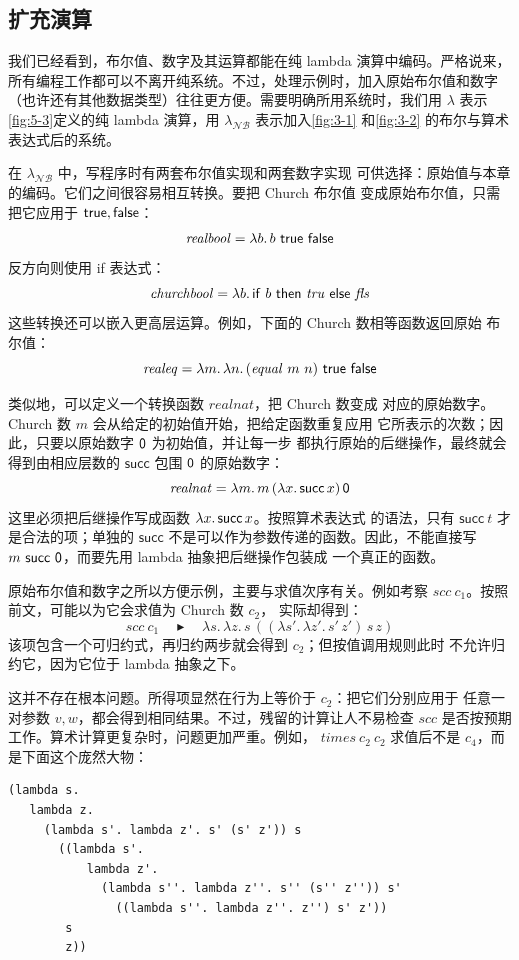 \subsection*{扩充演算}

我们已经看到，布尔值、数字及其运算都能在纯 lambda 演算中编码。严格说来，
所有编程工作都可以不离开纯系统。不过，处理示例时，加入原始布尔值和数字
（也许还有其他数据类型）往往更方便。需要明确所用系统时，我们用
\(\lambda\) 表示\cref{fig:5-3}定义的纯 lambda 演算，用
\(\lambda_{\mathcal{NB}}\) 表示加入\cref{fig:3-1} 和\cref{fig:3-2} 的布尔与算术
表达式后的系统。

在 \(\lambda_{\mathcal{NB}}\) 中，写程序时有两套布尔值实现和两套数字实现
可供选择：原始值与本章的编码。它们之间很容易相互转换。要把 Church 布尔值
变成原始布尔值，只需把它应用于 \(\mathsf{true},\mathsf{false}\)：
\[
 \mathit{realbool}=\lambda b.\,b\ \tapltrue\ \taplfalse
\]
反方向则使用 if 表达式：
\[
 \mathit{churchbool}
 =\lambda b.\,\mathsf{if}\ b\ \mathsf{then}\ \mathit{tru}\ \mathsf{else}\ \mathit{fls}
\]
这些转换还可以嵌入更高层运算。例如，下面的 Church 数相等函数返回原始
布尔值：
\[
 \mathit{realeq}
 =\lambda m.\,\lambda n.\,(\mathit{equal}\ m\ n)\ \tapltrue\ \taplfalse
\]

类似地，可以定义一个转换函数 \(\mathit{realnat}\)，把 Church 数变成
对应的原始数字。Church 数 \(m\) 会从给定的初始值开始，把给定函数重复应用
它所表示的次数；因此，只要以原始数字 \(\mathsf{0}\) 为初始值，并让每一步
都执行原始的后继操作，最终就会得到由相应层数的 \(\mathsf{succ}\) 包围
\(\mathsf{0}\) 的原始数字：
\[
 \mathit{realnat}=\lambda m.\,m\,(\lambda x.\,\mathsf{succ}\,x)\,\mathsf{0}
\]
这里必须把后继操作写成函数 \(\lambda x.\,\mathsf{succ}\,x\)。按照算术表达式
的语法，只有 \(\mathsf{succ}\ t\) 才是合法的项；单独的
\(\mathsf{succ}\) 不是可以作为参数传递的函数。因此，不能直接写
\(m\ \mathsf{succ}\ \mathsf{0}\)，而要先用 lambda 抽象把后继操作包装成
一个真正的函数。

原始布尔值和数字之所以方便示例，主要与求值次序有关。例如考察
\(\mathit{scc}\ c_1\)。按照前文，可能以为它会求值为 Church 数 \(c_2\)，
实际却得到：
\[
 \mathit{scc}\ c_1
 \quad\blacktriangleright\quad
 \lambda s.\,\lambda z.\,
 s\,((\lambda s'.\,\lambda z'.\,s'\,z')\,s\,z)
\]
该项包含一个可归约式，再归约两步就会得到 \(c_2\)；但按值调用规则此时
不允许归约它，因为它位于 lambda 抽象之下。

这并不存在根本问题。所得项显然在行为上等价于 \(c_2\)：把它们分别应用于
任意一对参数 \(v,w\)，都会得到相同结果。不过，残留的计算让人不易检查
\(\mathit{scc}\) 是否按预期工作。算术计算更复杂时，问题更加严重。例如，
\(\mathit{times}\ c_2\ c_2\) 求值后不是 \(c_4\)，而是下面这个庞然大物：
\begin{lstlisting}
(lambda s.
   lambda z.
     (lambda s'. lambda z'. s' (s' z')) s
       ((lambda s'.
           lambda z'.
             (lambda s''. lambda z''. s'' (s'' z'')) s'
               ((lambda s''. lambda z''. z'') s' z'))
        s
        z))
\end{lstlisting}

